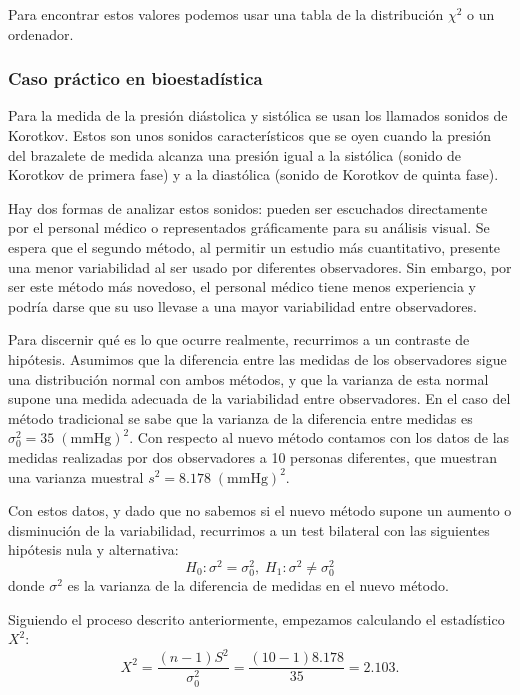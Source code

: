 \documentclass[a4paper,12pt]{article}
\begin{document}
    Para encontrar estos valores podemos usar una tabla de la distribución $\chi^2$ o un ordenador.

\subsubsection*{Caso práctico en bioestadística}
    Para la medida de la presión diástolica y sistólica se usan los llamados sonidos de Korotkov. 
    Estos son unos sonidos característicos que se oyen cuando la presión del brazalete de medida alcanza una presión igual a la sistólica (sonido de Korotkov de primera fase) y a la diastólica (sonido de Korotkov de quinta fase).

    Hay dos formas de analizar estos sonidos: pueden ser escuchados directamente por el personal médico o representados gráficamente para su análisis visual.
    Se espera que el segundo método, al permitir un estudio más cuantitativo, presente una menor variabilidad al ser usado por diferentes observadores.
    Sin embargo, por ser este método más novedoso, el personal médico tiene menos experiencia y podría darse que su uso llevase a una mayor variabilidad entre observadores.

    Para discernir qué es lo que ocurre realmente, recurrimos a un contraste de hipótesis. 
    Asumimos que la diferencia entre las medidas de los observadores sigue una distribución normal con ambos métodos, y que la varianza de esta normal supone una medida adecuada de la variabilidad entre observadores.
    En el caso del método tradicional se sabe que la varianza de la diferencia entre medidas es $\sigma_0^2=35 \; (\textrm{mmHg})^2$.
    Con respecto al nuevo método contamos con los datos de las medidas realizadas por dos observadores a 10 personas diferentes, que muestran una varianza muestral $s^2 = 8.178 \; (\textrm{mmHg})^2$.

    Con estos datos, y dado que no sabemos si el nuevo método supone un aumento o disminución de la variabilidad, recurrimos a un test bilateral con las siguientes hipótesis nula y alternativa:
    \begin{equation}
        H_0 : \sigma^2 = \sigma_0^2, \;
        H_1 : \sigma^2 \neq \sigma_0^2
    \end{equation}
    donde $\sigma^2$ es la varianza de la diferencia de medidas en el nuevo método.

    Siguiendo el proceso descrito anteriormente, empezamos calculando el estadístico $X^2$:
    \begin{equation}
        X^2
        =
        \frac{(n-1)S^2}{\sigma_0^2}
        =
        \frac{(10 - 1) 8.178}{35}
        =
        2.103
        .
    \end{equation}
\end{document}
